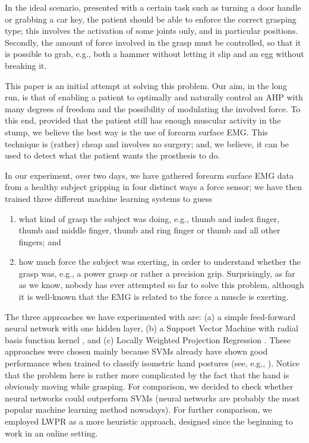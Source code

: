 In the ideal scenario, presented with a certain task such as turning a
door handle or grabbing a car key, the patient should be able to
enforce the correct grasping type; this involves the activation of
some joints only, and in particular positions. Secondly, the amount of
force involved in the grasp must be controlled, so that it is possible
to grab, e.g., both a hammer without letting it slip and an egg
without breaking it.

This paper is an initial attempt at solving this problem. Our aim, in
the long run, is that of enabling a patient to optimally and naturally
control an AHP with many degrees of freedom and the possibility of
modulating the involved force. To this end, provided that the patient
still has enough muscular activity in the stump, we believe the best
way is the use of forearm surface EMG. This technique is (rather)
cheap and involves no surgery; and, we believe, it can be used to
detect what the patient wants the prosthesis to do.

In our experiment, over two days, we have gathered forearm surface EMG
data from a healthy subject gripping in four distinct ways a force
sensor; we have then trained three different machine learning systems
to guess

\begin{enumerate}

  \item what kind of grasp the subject was doing, e.g., thumb and
    index finger, thumb and middle finger, thumb and ring finger or
    thumb and all other fingers; and

  \item how much force the subject was exerting, in order to
    understand whether the grasp was, e.g., a power grasp or rather a
    precision grip. Surprisingly, as far as we know, nobody has ever
    attempted so far to solve this problem, although it is well-known
    that the EMG is related to the force a muscle is exerting.

\end{enumerate}

The three approaches we have experimented with are:
(a) a simple feed-forward neural network with one hidden layer,
(b) a Support Vector Machine with radial basis function kernel
\cite{BGV92}, and (c) Locally Weighted Projection Regression
\cite{lwpr}. These approaches were chosen mainly because SVMs already
have shown good performance when trained to classify isometric hand
postures (see, e.g., \cite{smagt}). Notice that the problem here is
rather more complicated by the fact that the hand is obviously moving
while grasping. For comparison, we decided to check whether neural
networks could outperform SVMs (neural networks are probably the most
popular machine learning method nowadays). For further comparison, we
employed LWPR as a more heuristic approach, designed since the
beginning to work in an online setting.

